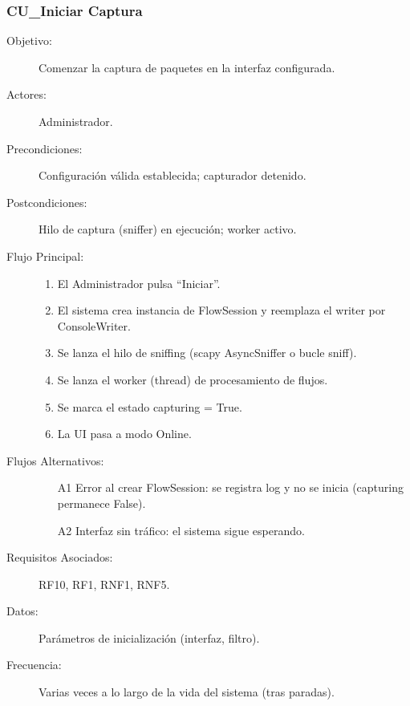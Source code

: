 \subsubsection{CU\_Iniciar Captura}
\begin{description}
  \item[Objetivo:] Comenzar la captura de paquetes en la interfaz configurada.
  \item[Actores:] Administrador.
  \item[Precondiciones:] Configuración válida establecida; capturador detenido.
  \item[Postcondiciones:] Hilo de captura (sniffer) en ejecución; worker activo.
  \item[Flujo Principal:]
    \begin{enumerate}
      \item El Administrador pulsa ``Iniciar''.
      \item El sistema crea instancia de FlowSession y reemplaza el writer por ConsoleWriter.
      \item Se lanza el hilo de sniffing (scapy AsyncSniffer o bucle sniff).
      \item Se lanza el worker (thread) de procesamiento de flujos.
      \item Se marca el estado capturing = True.
      \item La UI pasa a modo Online.
    \end{enumerate}
  \item[Flujos Alternativos:]
    \begin{enumerate}
      \item[A1] Error al crear FlowSession: se registra log y no se inicia (capturing permanece False).
      \item[A2] Interfaz sin tráfico: el sistema sigue esperando.
    \end{enumerate}
  \item[Requisitos Asociados:] RF10, RF1, RNF1, RNF5.
  \item[Datos:] Parámetros de inicialización (interfaz, filtro).
  \item[Frecuencia:] Varias veces a lo largo de la vida del sistema (tras paradas).
\end{description}

